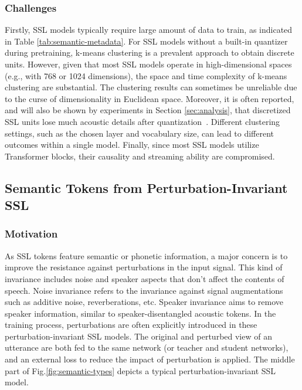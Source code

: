 \subsubsection{Challenges}
Firstly, SSL models typically require large amount of data to train, as indicated in Table \ref{tab:semantic-metadata}.
For SSL models without a built-in quantizer during pretraining, k-means clustering is a prevalent approach to obtain discrete units.
However, given that most SSL models operate in high-dimensional spaces (e.g., with 768 or 1024 dimensions), the space and time complexity of k-means clustering are substantial. 
The clustering results can sometimes be unreliable due to the curse of dimensionality in Euclidean space.
Moreover, it is often reported, and will also be shown by experiments in Section \ref{sec:analysis}, that discretized SSL units lose much acoustic details after quantization~\cite{polyak21,sicherman2023analysing,mousavi2024dasb}.
Different clustering settings, such as the chosen layer and vocabulary size, can lead to different outcomes within a single model.
Finally, since most SSL models utilize Transformer blocks, their causality and streaming ability are compromised.

\subsection{Semantic Tokens from Perturbation-Invariant SSL}
\label{sec:semantic-invariant}
\subsubsection{Motivation}
As SSL tokens feature semantic or phonetic information, a major concern is to improve the resistance against perturbations in the input signal.
This kind of invariance includes noise and speaker aspects that don't affect the contents of speech.
Noise invariance refers to the invariance against signal augmentations such as additive noise, reverberations, etc.
Speaker invariance aims to remove speaker information, similar to speaker-disentangled acoustic tokens.
In the training process, perturbations are often explicitly introduced in these perturbation-invariant SSL models.
The original and perturbed view of an utterance are both fed to the same network (or teacher and student networks), and an external loss to reduce the impact of perturbation is applied.
The middle part of Fig.\ref{fig:semantic-types} depicts a typical perturbation-invariant SSL model.

